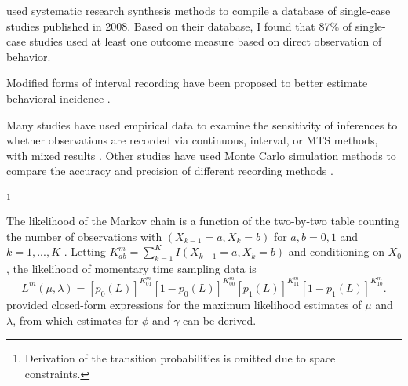 \citet{Shadish2011characteristics} used systematic research synthesis methods to compile a database of single-case studies published in 2008. Based on their database, I found that 87\% of single-case studies used at least one outcome measure based on direct observation of behavior.

 \citep[for surveys concerning the use of different methods, see][]{Mann1991, Rapp2007interval, Mudford2009}

 Modified forms of interval recording have been proposed to better estimate behavioral incidence \citep{Powell1984}. 

Many studies have used empirical data to examine the sensitivity of inferences to whether observations are recorded via continuous, interval, or MTS methods, with mixed results \citep[e.g.,][]{Powell1975, Murphy1980, Bornstein2002, Gunter2003, Gardenier2004, Rapp2007interval, Meany-Daboul2007, Alvero2007}. Other studies have used Monte Carlo simulation methods to compare the accuracy and precision of different recording methods \citep[e.g.,][]{Repp1976, Harrop1986, Harrop1990, Rapp2008detecting, Carroll2009detecting, Devine2011detecting}. 

\footnote{Derivation of the transition probabilities is omitted due to space constraints.}

The likelihood of the Markov chain is a function of the two-by-two table counting the number of observations with $(X_{k-1} = a, X_k = b)$ for $a,b = 0,1$ and $k = 1,...,K$ . Letting $K_{ab}^m = \sum_{k=1}^K I(X_{k-1} = a, X_k = b)$ and conditioning on $X_0$, the likelihood of momentary time sampling data is \begin{equation}
L^m(\mu, \lambda) = \left[ p_0(L)\right]^{K_{01}^m} \left[1 - p_0(L)\right]^{K_{00}^m} \left[ p_1(L)\right]^{K_{11}^m} \left[1 - p_1(L)\right]^{K_{10}^m}.
\end{equation}
\citet{Brown1977estimation} provided closed-form expressions for the maximum likelihood estimates of $\mu$ and $\lambda$, from which estimates for $\phi$ and $\gamma$ can be derived.